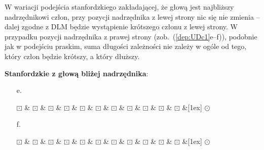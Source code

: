 \documentclass[licencjacka]{pracamgr_Kogni}
\begin{document}
    W wariacji podejścia stanfordzkiego zakładającej, że głową jest najbliższy nadrzędnikowi człon, przy pozycji nadrzędnika z lewej strony nic się nie zmienia -- dalej zgodne z DLM będzie wystąpienie krótszego członu z lewej strony.
    W przypadku pozycji nadrzędnika z prawej strony (zob.~(\ref{dep:UDc1}e--f)), podobnie jak w podejściu praskim, suma długości zależności nie zależy w ogóle od tego, który człon będzie krótszy, a który dłuższy.
    \begin{exe}
        \item\label{dep:UDc} \textbf{Stanfordzkie z głową bliżej nadrzędnika}:
        \begin{enumerate}[label=\alph{enumi}. , ref=(16\alph{enumi})]
            \item[e. ]
            \begin{dependency}[baseline=-3pt, hide label, edge height=.5em]
                \begin{deptext}[column sep=.1ex]
                    $\boxdot$ \& $\boxdot$ \& $\boxdot$ \& $\boxdot$ \& $\boxdot$ \& $\boxdot$ \& $\boxdot$ \& $\boxdot$ \& $\boxdot$ \& $\boxdot$ \& $\boxdot$ \&[1ex] $\odot$ \\
                \end{deptext}
            \end{dependency}
            \label{dep:UDc1}
            \item[f. ]
            \begin{dependency}[baseline=-3pt, hide label, edge height=.5em]
                \begin{deptext}[column sep=.1ex]
                    $\boxdot$ \& $\boxdot$ \& $\boxdot$ \& $\boxdot$ \& $\boxdot$ \& $\boxdot$ \& $\boxdot$ \& $\boxdot$ \& $\boxdot$ \& $\boxdot$ \& $\boxdot$ \&[1ex] $\odot$ \\
                \end{deptext}
            \end{dependency}
            \label{dep:UDc2}
        \end{enumerate}
    \end{exe}
\end{document}
